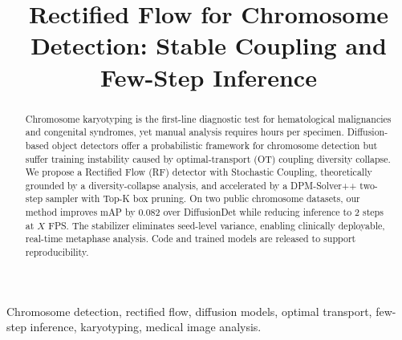 \documentclass[journal,10pt]{IEEEtran}
\begin{document}
\title{Rectified Flow for Chromosome Detection: Stable Coupling and Few-Step Inference}

\author{
}


\maketitle

\begin{abstract}
Chromosome karyotyping is the first-line diagnostic test for hematological
malignancies and congenital syndromes, yet manual analysis requires hours
per specimen. Diffusion-based object detectors offer a probabilistic
framework for chromosome detection but suffer training instability caused
by optimal-transport (OT) coupling diversity collapse. We propose a
Rectified Flow (RF) detector with Stochastic Coupling, theoretically
grounded by a diversity-collapse analysis, and accelerated by a
DPM-Solver++ two-step sampler with Top-K box pruning. On two public
chromosome datasets, our method improves mAP by 0.082 over
DiffusionDet while reducing inference to 2 steps at $X$ FPS. The
stabilizer eliminates seed-level variance, enabling clinically
deployable, real-time metaphase analysis. Code and trained models
are released to support reproducibility.
\end{abstract}

\begin{IEEEkeywords}
Chromosome detection, rectified flow, diffusion models, optimal transport, few-step inference, karyotyping, medical image analysis.
\end{IEEEkeywords}

\end{document}
